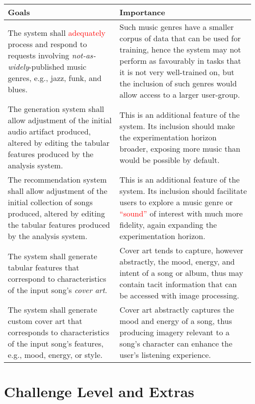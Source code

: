 \documentclass{article}
\begin{document}
\begin{table}[h!]
    \centering
    \begin{tabular}{p{} || p{}}
        \toprule
        \textbf{Goals} & \textbf{Importance} \\
        \midrule
        The system shall \textcolor{red}{adequately} process and respond to requests involving \emph{not-as-widely}-published music genres, e.g., jazz, funk, and blues. & Such music genres have a smaller corpus of data that can be used for training, hence the system may not perform as favourably in tasks that it is not very well-trained on, but the inclusion of such genres would allow access to a larger user-group. \\
        \midrule
        The generation system shall allow adjustment of the initial audio artifact produced, altered by editing the tabular features produced by the analysis system. & This is an additional feature of the system. Its inclusion should make the experimentation horizon broader, exposing more music than would be possible by default. \\
        \midrule
        The recommendation system shall allow adjustment of the initial collection of songs produced, altered by editing the tabular features produced by the analysis system. & This is an additional feature of the system. Its inclusion should facilitate users to explore a music genre or \textcolor{red}{``sound''} of interest with much more fidelity, again expanding the experimentation horizon. \\
        \midrule
        The system shall generate tabular features that correspond to characteristics of the input song's \emph{cover art}. & Cover art tends to capture, however abstractly, the mood, energy, and intent of a song or album, thus may contain tacit information that can be accessed with image processing. \\
        \midrule
        The system shall generate custom cover art that corresponds to characteristics of the input song's features, e.g., mood, energy, or style. & Cover art abstractly captures the mood and energy of a song, thus producing imagery relevant to a song's character can enhance the user's listening experience. \\
        \bottomrule
    \end{tabular}
\end{table}

\newpage
\section{Challenge Level and Extras}
\end{document}

